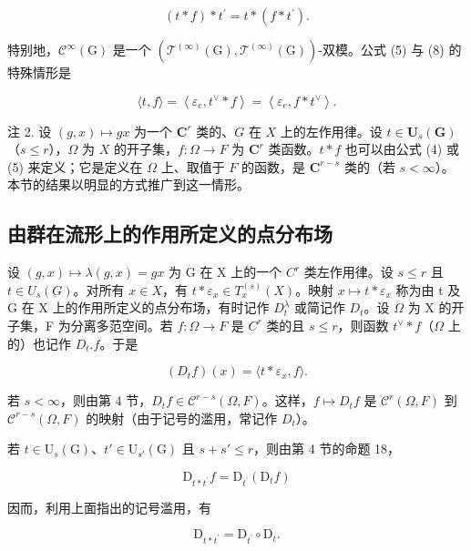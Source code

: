 \[
(t * f) * t ^ {\prime} = t * (f * t ^ {\prime}).\tag{14}
\]

特别地，\(\mathcal{C}^{\infty}(\mathrm{G})\) 是一个 \((\mathcal{T}^{(\infty)}(\mathrm{G}),\mathcal{T}^{(\infty)}(\mathrm{G}))\)-双模。公式 (5) 与 (8) 的特殊情形是

\[
\langle t, f \rangle = \left\langle \varepsilon_ {e}, t ^ {\vee} * f \right\rangle = \left\langle \varepsilon_ {e}, f * t ^ {\vee} \right\rangle .\tag{15}
\]

注 2. 设 \((g,x)\mapsto gx\) 为一个 \(\mathbf{C}^r\) 类的、\(G\) 在 \(X\) 上的左作用律。设 \(t\in \mathbf{U}_s(\mathbf{G})\)（\(s\leqslant r\)），\(\Omega\) 为 \(X\) 的开子集，\(f\colon \Omega \to F\) 为 \(\mathbf{C}^r\) 类函数。\(t*f\) 也可以由公式 (4) 或 (5) 来定义；它是定义在 \(\Omega\) 上、取值于 \(F\) 的函数，是 \(\mathbf{C}^{r - s}\) 类的（若 \(s < \infty\)）。本节的结果以明显的方式推广到这一情形。

\subsection{由群在流形上的作用所定义的点分布场}

设 \((g,x)\mapsto\lambda(g,x)=gx\) 为 G 在 X 上的一个 \(C^{r}\) 类左作用律。设 \(s\leqslant r\) 且 \(t\in U_{s}(G)\)。对所有 \(x\in X\)，有 \(t*\varepsilon_{x}\in T_{x}^{(s)}(X)\)。映射 \(x\mapsto t*\varepsilon_{x}\) 称为由 t 及 G 在 X 上的作用所定义的点分布场，有时记作 \(D_{t}^{\lambda}\) 或简记作 \(D_{t}\)。设 \(\Omega\) 为 X 的开子集，F 为分离多范空间。若 \(f\colon\Omega\to F\) 是 \(C^{r}\) 类的且 \(s\leqslant r\)，则函数 \(t^{\vee}\ast f\)（\(\Omega\) 上的）也记作 \(D_{t}.f\)。于是

\[
(D _ {t} f) (x) = \langle t * \varepsilon_ {x}, f \rangle .\tag{16}
\]

若 \(s < \infty\)，则由第 4 节，\(D_t f \in \mathcal{C}^{r-s}(\Omega, F)\)。这样，\(f \mapsto D_t f\) 是 \(\mathcal{C}^r(\Omega, F)\) 到 \(\mathcal{C}^{r-s}(\Omega, F)\) 的映射（由于记号的滥用，常记作 \(D_t\)）。

若 \(t \in \mathrm{U}_s(\mathrm{G})\)、\(t' \in \mathrm{U}_{s'}(\mathrm{G})\) 且 \(s + s' \leqslant r\)，则由第 4 节的命题 18，

\[
\mathrm{D} _ {t * t ^ {\prime}} f = \mathrm{D} _ {t ^ {\prime}} (\mathrm{D} _ {t} f)\tag{17}
\]

因而，利用上面指出的记号滥用，有

\[
\mathrm{D} _ {t * t ^ {\prime}} = \mathrm{D} _ {t ^ {\prime}} \circ \mathrm{D} _ {t}.\tag{18}
\]

